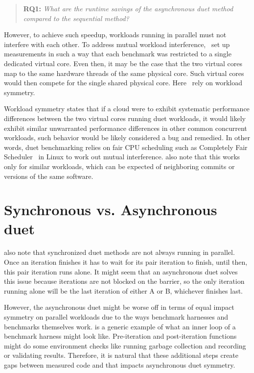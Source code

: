 \begin{quote}
	\textbf{RQ1:} \emph{What are the runtime savings of the asynchronous duet method compared to the sequential method?}
\end{quote}

However, to achieve such speedup, workloads running in parallel must not interfere with each other.
To address mutual workload interference,~\citet{bulej2020duet} set up measurements in such a way that each benchmark was restricted to a single dedicated virtual core.
Even then, it may be the case that the two virtual cores map to the same hardware threads of the same physical core.
Such virtual cores would then compete for the single shared physical core.
Here~\citet{bulej2019initial} rely on workload symmetry.

Workload symmetry states that if a cloud were to exhibit systematic performance differences between the two virtual cores running duet workloads, it would likely exhibit similar unwarranted performance differences in other common concurrent workloads, such behavior would be likely considered a bug and remedied.
In other words, duet benchmarking relies on fair CPU scheduling such as Completely Fair Scheduler~\cite{pabla2009completely} in Linux to work out mutual interference.
\citet{bulej2019initial} also note that this works only for similar workloads, which can be expected of neighboring commits or versions of the same software.


\section{Synchronous vs. Asynchronous duet}

 also note that synchronized duet methods are not always running in parallel.
Once an iteration finishes it has to wait for its pair iteration to finish, until then, this pair iteration runs alone.
It might seem that an asynchronous duet solves this issue because iterations are not blocked on the barrier, so the only iteration running alone will be the last iteration of either A or B, whichever finishes last.

However, the asynchronous duet might be worse off in terms of equal impact symmetry on parallel workloads due to the ways benchmark harnesses and benchmarks themselves work.
 is a generic example of what an inner loop of a benchmark harness might look like.
Pre-iteration and post-iteration functions might do some environment checks like running garbage collection and recording or validating results.
Therefore, it is natural that these additional steps create gaps between measured code and that impacts asynchronous duet symmetry.

